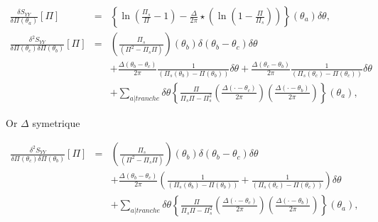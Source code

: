 	\begin{eqnarray}
		\frac{ \delta S_{YY} }{ \delta \Pi(\theta_a)  } [\Pi ]  & = &    \left \{ \ln \left ( \frac{ \Pi_s }{ \Pi  } - 1 \right )   -  \frac{ \Delta}{2\pi}  \star \left ( \ln \left ( 1 - \frac{ \Pi}{ \Pi_s }\right ) \right ) \right \} (\theta_a) \delta \theta , \\
		\frac{ \delta^2 S_{YY} }{ \delta \Pi(\theta_c) \delta \Pi(\theta_b)  } [\Pi ]  & = &   \left (  \frac{\Pi_s}{(\Pi^2  - \Pi_s\Pi)}    \right )(\theta_b) \delta( \theta_b - \theta_c)  \delta \theta  \\
		&  &  +   \frac{ \Delta ( \theta_b - \theta_c)}{ 2\pi}  \frac{1 }{(\Pi_s(\theta_b) -\Pi(\theta_b)) } \delta \theta +  \frac{\Delta ( \theta_c - \theta_b )}{2\pi}\frac{1 }{( \Pi_s(\theta_c)  -   \Pi(\theta_c) ) }\delta \theta  \\
		& & + \sum_{a \vert tranche}   \delta \theta \left \{  \frac{\Pi }{\Pi_s\Pi - \Pi_s^2 }\left (  \frac{\Delta ( \cdot - \theta_c )}{2\pi} \right )\left (  \frac{\Delta ( \cdot - \theta_b )}{2\pi} \right )  \right \}(\theta_a) ,	 	
	\end{eqnarray}
	
	

		
	Or $\Delta$ symetrique 
		
	\begin{eqnarray}
		\frac{ \delta^2 S_{YY} }{ \delta \Pi(\theta_c) \delta \Pi(\theta_b)  } [\Pi ]  & = &   \left (  \frac{\Pi_s}{(\Pi^2  - \Pi_s\Pi)}    \right )(\theta_b) \delta( \theta_b - \theta_c)  \delta \theta  \\
		&  &  +   \frac{ \Delta ( \theta_b - \theta_c)}{ 2\pi} \left (  \frac{1 }{(\Pi_s(\theta_b) -\Pi(\theta_b)) }  +  \frac{1 }{( \Pi_s(\theta_c)  -   \Pi(\theta_c) ) } \right )\delta \theta  \\
		& & + \sum_{a \vert tranche}   \delta \theta \left \{  \frac{\Pi }{\Pi_s\Pi - \Pi_s^2 }\left (  \frac{\Delta ( \cdot - \theta_c )}{2\pi} \right )\left (  \frac{\Delta ( \cdot - \theta_b )}{2\pi} \right )  \right \}(\theta_a) ,		
	\end{eqnarray}



